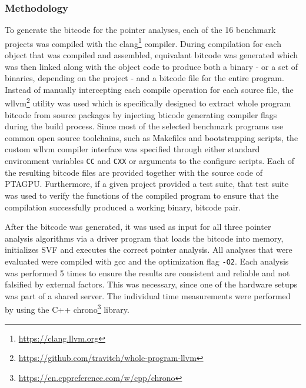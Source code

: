 \subsubsection{Methodology}
To generate the bitcode for the pointer analyses, each of the 16 benchmark projects was compiled with the clang\footnote{\url{https://clang.llvm.org}} compiler. During compilation for each object that was compiled and assembled, equivalant bitcode was generated which was then linked along with the object code to produce both a binary - or a set of binaries, depending on the project - and a bitcode file for the entire program.
Instead of manually intercepting each compile operation for each source file, the wllvm\footnote{\url{https://github.com/travitch/whole-program-llvm}} utility was used which is specifically designed to extract whole program bitcode from source packages by injecting bticode generating compiler flags during the build process.
Since most of the selected benchmark programs use common open source toolchains, such as Makefiles and bootstrapping scripts, the custom wllvm compiler interface was specified through either standard environment variables  \verb|CC| and  \verb|CXX| or arguments to the configure scripts.
Each of the resulting bitcode files are provided together with the source code of PTAGPU.
Furthermore, if a given project provided a test suite, that test suite was used to verify the functions of the compiled program to ensure that the compilation successfully produced a working binary, bitcode pair. 

After the bitcode was generated, it was used as input for all three pointer analysis algorithms via a driver program that loads the bitcode into memory, initializes SVF and executes the correct pointer analysis.
All analyses that were evaluated were compiled with gcc and the optimization flag \verb|-O2|.
Each analysis was performed 5 times to ensure the results are consistent and reliable and not falsified by external factors. This was necessary, since one of the hardware setups was part of a shared server.
The individual time measurements were performed by using the C++ chrono\footnote{\url{https://en.cppreference.com/w/cpp/chrono}} library.

